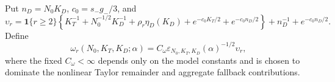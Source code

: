 Put \(n_D=N_0K_D\), \(c_0=s_-g_-/3\), and
\[
 \upsilon_r=
 \mathbf 1\{r\ge2\}\left\{K_T^{-1}+N_0^{-1/2}K_D^{-1}
 +\rho_r\eta_D(K_D)+e^{-c_0K_T/2}+e^{-c_0n_D/2}\right\}
 +n_D^{-1}+e^{-c_0n_D/2}.
\]
Define
\[
 \omega_r(N_0,K_T,K_D;\alpha)
 =C_\omega\varepsilon_{N_0,K_T,K_D}(\alpha)^{-1/2}\upsilon_r,
\]
where the fixed \(C_\omega<\infty\) depends only on the model constants and is chosen to dominate the nonlinear Taylor remainder and aggregate fallback contributions.